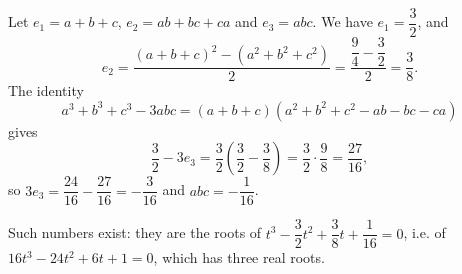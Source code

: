 Let $e_1=a+b+c$, $e_2=ab+bc+ca$ and $e_3=abc$. We have $e_1=\dfrac{3}{2}$, and
\[
e_2=\dfrac{(a+b+c)^2-(a^2+b^2+c^2)}{2}=\dfrac{\dfrac{9}{4}-\dfrac{3}{2}}{2}=\dfrac{3}{8} .
\]
The identity
\[
a^3+b^3+c^3-3abc=(a+b+c)\left(a^2+b^2+c^2-ab-bc-ca\right)
\]
gives
\[
\dfrac{3}{2}-3e_3=\dfrac{3}{2}\left(\dfrac{3}{2}-\dfrac{3}{8}\right)=\dfrac{3}{2}\cdot\dfrac{9}{8}=\dfrac{27}{16},
\]
so $3e_3=\dfrac{24}{16}-\dfrac{27}{16}=-\dfrac{3}{16}$ and $abc=\boxed{-\dfrac{1}{16}}$.

Such numbers exist: they are the roots of $t^3-\dfrac{3}{2}t^2+\dfrac{3}{8}t+\dfrac{1}{16}=0$, i.e. of $16t^3-24t^2+6t+1=0$, which has three real roots.
